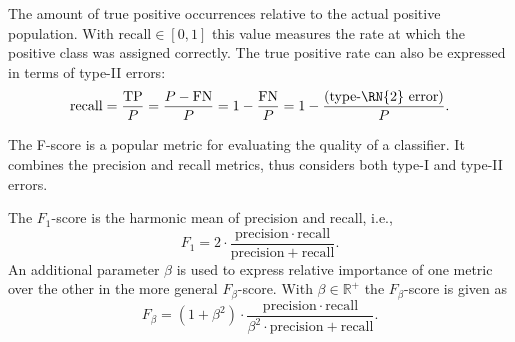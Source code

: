     \begin{definition}[recall]
    \label{def:recall}
        The amount of true positive occurrences relative to the actual positive population.
        With $\mathrm{recall} \in [0,1]$ this value measures the rate at which the positive class was assigned correctly.
        The true positive rate can also be expressed in terms of type-\RN{2} errors:
        \begin{equation}
            \mathrm{recall} = \frac{\mathrm{TP}}{P} = \frac{P-\mathrm{FN}}{P} = 1-\frac{\mathrm{FN}}{P} = 1-\frac{(\text{type-\RN{2} error})}{P} \text{.}
        \end{equation}
    \end{definition}

    The F-score is a popular metric for evaluating the quality of a classifier.
    It combines the precision and recall metrics, thus considers both type-\RN{1} and type-\RN{2} errors.
    \begin{definition}[F-score]
        The $F_1$-score is the harmonic mean of precision and recall, i.e.,
        \begin{equation}
            F_1 = 2 \cdot \frac{\mathrm{precision} \cdot \mathrm{recall}}{\mathrm{precision} + \mathrm{recall}} \text{.}
        \end{equation}
        An additional parameter $\beta$ is used to express relative importance of one metric over the other in the more general $F_{\beta}$-score.
        With $\beta \in \mathbb{R}^+$ the $F_{\beta}$-score is given as
        \begin{equation}
            F_{\beta} = (1+{\beta}^2) \cdot \frac{\mathrm{precision} \cdot \mathrm{recall}}{{\beta}^2 \cdot \mathrm{precision} + \mathrm{recall}} \text{.}
        \end{equation}
    \end{definition}

